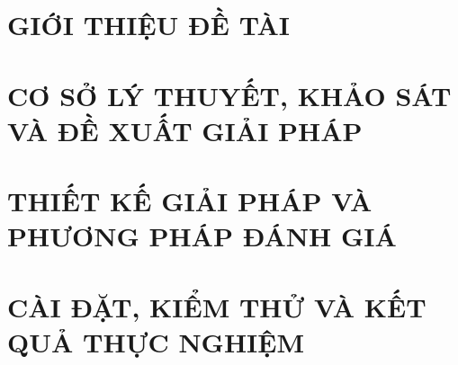 \documentclass[a4paper,12pt,oneside]{report}
\renewcommand{\headrulewidth}{0pt}
\theoremstyle{definition}
\begin{document}
\renewcommand{\listtablename}{DANH MỤC BẢNG BIỂU}
{\let\oldnumberline\numberline
\renewcommand{\numberline}{Bảng~\oldnumberline}
\listoftables}
\newpage


\newpage

\glsaddall 
 \renewcommand*{\glossaryname}{Danh sách thuật ngữ}
\renewcommand*{\acronymname}{DANH MỤC THUẬT NGỮ VÀ TỪ VIẾT TẮT}
\renewcommand*{\entryname}{Thuật ngữ}
\renewcommand*{\descriptionname}{Ý nghĩa}
\printnoidxglossaries


% 


\newpage
{}

\pagestyle{plain} %

\chapter{GIỚI THIỆU ĐỀ TÀI}
\label{chapter:Introduction}

\newpage
\chapter{CƠ SỞ LÝ THUYẾT, KHẢO SÁT VÀ ĐỀ XUẤT GIẢI PHÁP}
\label{chapter:Related_works}



\newpage
\chapter{THIẾT KẾ GIẢI PHÁP VÀ PHƯƠNG PHÁP ĐÁNH GIÁ}
\label{chapter:Methodology}


\newpage
\chapter{CÀI ĐẶT, KIỂM THỬ VÀ KẾT QUẢ THỰC NGHIỆM}
\label{chapter:Experiment}

\end{document}

